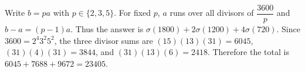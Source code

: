 Write $b=pa$ with $p\in\{2,3,5\}$. For fixed $p$, $a$ runs over all divisors of $\dfrac{3600}{p}$ and $b-a=(p-1)a$. Thus the answer is $\sigma(1800)+2\sigma(1200)+4\sigma(720)$. Since $3600=2^4 3^2 5^2$, the three divisor sums are $(15)(13)(31)=6045$, $(31)(4)(31)=3844$, and $(31)(13)(6)=2418$. Therefore the total is $6045+7688+9672=\boxed{23405}$.
